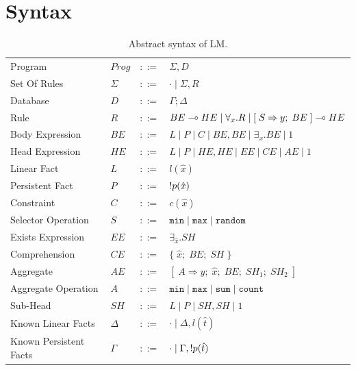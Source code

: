 \section{Syntax}

\renewcommand{\arraystretch}{1.5}
\newcommand{\selector}[0]{[\; S \Rightarrow y; \; BE \;] \lolli HE}
\newcommand{\comprehension}[0]{\{ \; \widehat{x}; \; BE; \; SH \; \}}
\newcommand{\aggregate}[0]{[\; A \Rightarrow y; \; \widehat{x}; \; BE; \; SH_1; \; SH_2 \;]}

\begin{table}[h]
\centering
\begin{tabular}{ l l c l }
  Program & $Prog$ & $::=$ & $\Sigma, D$ \\
  Set Of Rules & $\Sigma$ & $::=$ & $\cdot \; | \; \Sigma, R$\\
  Database & $D$ & $::=$ & $\Gamma; \Delta$ \\
  Rule & $R$ & $::=$ & $BE \lolli HE \; | \; \forall_{x}. R \; | \; \selector$ \\
  Body Expression & $BE$ & $::=$ & $L \; | \; P \; | \; C \; | \; BE, BE \; | \; \exists_{x}. BE \; | \; 1$\\
  Head Expression & $HE$ & $::=$ & $L \; | \; P \; | \; HE, HE \; | \; EE \; | \; CE \; | \; AE \; | \; 1$\\
  
  Linear Fact & $L$ & $::=$ & $l(\hat{x})$\\
  Persistent Fact & $P$ & $::=$ & ${!} p(\hat{x})$\\
  Constraint & $C$ & $::=$ & $c(\hat{x})$ \\
  Selector Operation & $S$ & $::=$ & $\mathtt{min} \; | \; \mathtt{max} \; | \; \mathtt{random}$\\
  
  Exists Expression & $EE$ & $::=$ & $\exists_{\widehat{x}}. SH$ \\
  Comprehension & $CE$ & $::=$ & $\comprehension$ \\
  Aggregate & $AE$ & $::=$ & $\aggregate$ \\
  Aggregate Operation & $A$ & $::=$ & $\mathtt{min} \; | \; \mathtt{max} \; | \; \mathtt{sum} \; | \; \mathtt{count}$ \\
  
  Sub-Head & $SH$ & $::=$ & $L \; | \; P \; | \; SH, SH \; | \; 1$\\
  
  Known Linear Facts & $\Delta$ & $::=$ & $\cdot \; | \; \Delta, l(\hat{t})$ \\
  Known Persistent Facts & $\Gamma$ & $::=$ & $\cdot \; | \; \Gamma, {!} p(\hat{t})$ \\
\end{tabular}
\caption{Abstract syntax of LM.}\label{tbl:ast}
\end{table}

